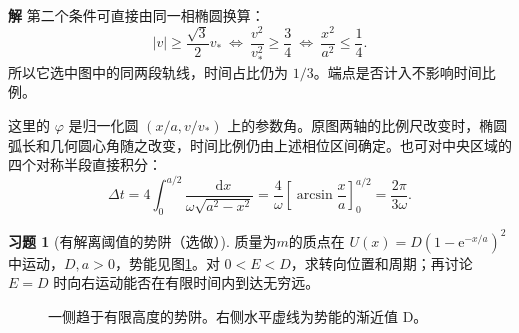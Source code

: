 \documentclass[11pt,openany,fontset=fandol]{ctexbook}
\theoremstyle{definition}\newtheorem{example}{例}[chapter]\newtheorem{exercise}{习题}[chapter]
\newcommand{\SolutionStart}{\par\medskip\ifdim\pagetotal>0pt\ifdim\dimexpr\pagegoal-\pagetotal\relax<3\baselineskip\newpage\fi\fi\noindent\textbf{解}\quad\ignorespaces}
\newenvironment{solution}{\SolutionStart}{\par\medskip}
\newcommand{\dd}{\mathop{}\!\mathrm d}\newcommand{\ee}{\mathrm e}\newcommand{\vct}[1]{\bm{#1}}
\begin{document}
\begin{solution}
第二个条件可直接由同一相椭圆换算：
\[
|v|\ge\frac{\sqrt3}{2}v_*
\ \Longleftrightarrow\ 
\frac{v^2}{v_*^2}\ge\frac34
\ \Longleftrightarrow\ 
\frac{x^2}{a^2}\le\frac14.
\]
所以它选中图中的同两段轨线，时间占比仍为 $1/3$。端点是否计入不影响时间比例。

这里的 $\varphi$ 是归一化圆 $(x/a,v/v_*)$ 上的参数角。原图两轴的比例尺改变时，椭圆弧长和几何圆心角随之改变，时间比例仍由上述相位区间确定。也可对中央区域的四个对称半段直接积分：
\[
\Delta t=4\int_0^{a/2}\frac{\dd x}{\omega\sqrt{a^2-x^2}}
=\frac4\omega\left[\arcsin\frac xa\right]_0^{a/2}
=\frac{2\pi}{3\omega}.
\]
\end{solution}

\par\medskip\noindent\begin{minipage}{\textwidth}
\begin{exercise}[有解离阈值的势阱（选做）]\label{mp4:exercise:l4-h4}
质量为$m$的质点在 $U(x)=D(1-\ee^{-x/a})^2$ 中运动，$D,a>0$，势能见图\ref{mp4:fig:l4-h4-q}。对 $0<E<D$，求转向位置和周期；再讨论 $E=D$ 时向右运动能否在有限时间内到达无穷远。
\end{exercise}

\begin{figure}[H]\centering
{}
\caption{一侧趋于有限高度的势阱。右侧水平虚线为势能的渐近值 D。}\label{mp4:fig:l4-h4-q}
\end{figure}
\end{minipage}\par\medskip
\end{document}
